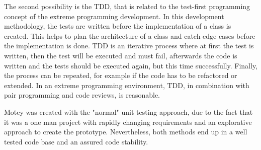 The second possibility is the \ac{TDD}, that is related to the test-first programming concept of the extreme programming development.
In this development methodology, the tests are written before the implementation of a class is created.
This helps to plan the architecture of a class and catch edge cases before the implementation is done.
\ac{TDD} is an iterative process where at first the test is written, then the test will be executed and must fail, afterwards the code is written and the tests should be executed again, but this time successfully.
Finally, the process can be repeated, for example if the code has to be refactored or extended.
In an extreme programming environment, \ac{TDD}, in combination with pair programming and code reviews, is reasonable.\newline

Motey was created with the "normal" unit testing approach, due to the fact that it was a one man project with rapidly changing requirements and an explorative approach to create the prototype.
Nevertheless, both methods end up in a well tested code base and an assured code stability.
